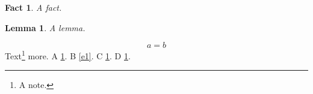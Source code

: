 \documentclass{article}
\newtheorem{fact}{Fact}
\newtheorem{lemma}{Lemma}
\begin{document}
\begin{fact}\label{f1}A fact.\end{fact}
\begin{lemma}\label{l1}A lemma.\end{lemma}
\begin{equation}a=b\label{e1}\end{equation}
Text\footnote{A note.\label{fn1}} more.
A \cref{f1}. B \cref{e1}. C \cref{fn1}. D \cref{l1}.
\end{document}
